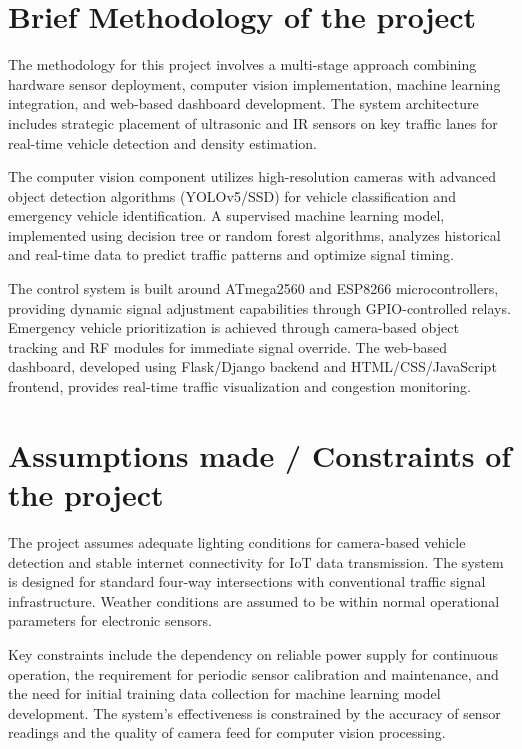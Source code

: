 \documentclass[12pt]{report}
\begin{document}
\section[Brief Methodology of the project]{\textbf{Brief Methodology of the project}}

The methodology for this project involves a multi-stage approach combining hardware sensor deployment, computer vision implementation, machine learning integration, and web-based dashboard development. The system architecture includes strategic placement of ultrasonic and IR sensors on key traffic lanes for real-time vehicle detection and density estimation.

The computer vision component utilizes high-resolution cameras with advanced object detection algorithms (YOLOv5/SSD) for vehicle classification and emergency vehicle identification. A supervised machine learning model, implemented using decision tree or random forest algorithms, analyzes historical and real-time data to predict traffic patterns and optimize signal timing.

The control system is built around ATmega2560 and ESP8266 microcontrollers, providing dynamic signal adjustment capabilities through GPIO-controlled relays. Emergency vehicle prioritization is achieved through camera-based object tracking and RF modules for immediate signal override. The web-based dashboard, developed using Flask/Django backend and HTML/CSS/JavaScript frontend, provides real-time traffic visualization and congestion monitoring.

\section[Assumptions made / Constraints of the project]{\textbf{Assumptions made / Constraints of the project}}

The project assumes adequate lighting conditions for camera-based vehicle detection and stable internet connectivity for IoT data transmission. The system is designed for standard four-way intersections with conventional traffic signal infrastructure. Weather conditions are assumed to be within normal operational parameters for electronic sensors.

Key constraints include the dependency on reliable power supply for continuous operation, the requirement for periodic sensor calibration and maintenance, and the need for initial training data collection for machine learning model development. The system's effectiveness is constrained by the accuracy of sensor readings and the quality of camera feed for computer vision processing.
\end{document}
